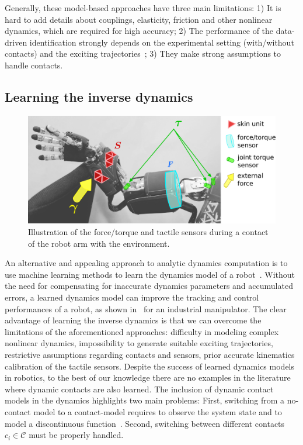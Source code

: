 Generally, these model-based approaches have three main limitations: 1) It is
hard to add details about couplings, elasticity, friction and other nonlinear
dynamics, which are required for high accuracy; 2) The performance of the
data-driven identification strongly depends on the experimental setting
(with/without contacts) and the exciting trajectories~\cite{Pedrocchi2014}; 3)
They make strong assumptions to handle contacts.

\subsection{Learning the inverse dynamics}

    \begin{figure}[t]
        \centering
        \includegraphics[width=.6\columnwidth]{robertoICRA/fig/concept_gray_new}		
        \caption{Illustration of the force/torque and tactile sensors during a contact of the robot arm with the environment.}
        \label{fig:concept}
    \end{figure}
An alternative and appealing approach to analytic dynamics computation is to use
machine learning methods to learn the dynamics model of a
robot~\cite{Nguyen-Tuong2008,Vijayakumar2000,Deisenroth2012}. Without the need
for compensating for inaccurate dynamics parameters and accumulated errors, a
learned dynamics model can improve the tracking and control performances of a
robot, as shown in~\cite{Nguyen-Tuong2011} for an industrial manipulator. The
clear advantage of learning the inverse dynamics is that we can overcome the
limitations of the aforementioned approaches: difficulty in modeling complex
nonlinear dynamics, impossibility to generate suitable exciting trajectories,
restrictive assumptions regarding contacts and sensors, prior accurate
kinematics calibration of the tactile sensors. Despite the success of learned
dynamics models in robotics, to the best of our knowledge there are no examples
in the literature where dynamic contacts are also learned. The inclusion of
dynamic contact models in the dynamics highlights two main problems: First,
switching from a no-contact model to a contact-model requires to observe the
system state and to model a discontinuous function~\cite{Toussaint2005}. Second,
switching between different contacts $c_i \in\mathcal{C}$ must be properly
handled.

